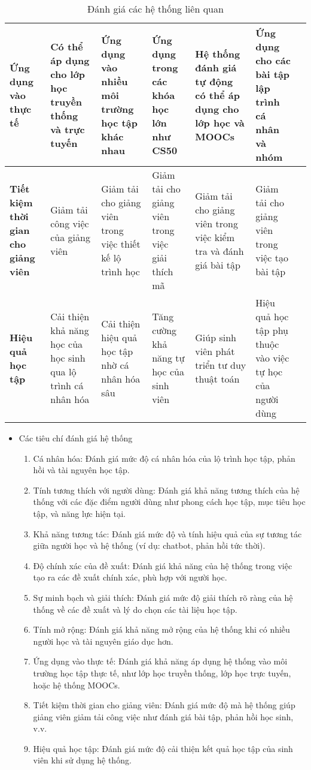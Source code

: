 \begin{table}[ht]
{\begin{tabular}{|p{3.5cm}|p{3.5cm}|p{3.5cm}|p{3.5cm}|p{3.5cm}|p{3.5cm}|p{3.5cm}|}
    \textbf{Ứng dụng vào thực tế} & Có thể áp dụng cho lớp học truyền thống và trực tuyến & Ứng dụng vào nhiều môi trường học tập khác nhau & Ứng dụng trong các khóa học lớn như CS50 & Hệ thống đánh giá tự động có thể áp dụng cho lớp học và MOOCs & Ứng dụng cho các bài tập lập trình cá nhân và nhóm \\ \hline
    \textbf{Tiết kiệm thời gian cho giảng viên} & Giảm tải công việc của giảng viên & Giảm tải cho giảng viên trong việc thiết kế lộ trình học & Giảm tải cho giảng viên trong việc giải thích mã & Giảm tải cho giảng viên trong việc kiểm tra và đánh giá bài tập & Giảm tải cho giảng viên trong việc tạo bài tập \\ \hline
    \textbf{Hiệu quả học tập} & Cải thiện khả năng học của học sinh qua lộ trình cá nhân hóa & Cải thiện hiệu quả học tập nhờ cá nhân hóa sâu & Tăng cường khả năng tự học của sinh viên & Giúp sinh viên phát triển tư duy thuật toán & Hiệu quả học tập phụ thuộc vào việc tự học của người dùng \\ \hline
    \end{tabular}
    }
    \caption{Đánh giá các hệ thống liên quan}
    \end{table}
\begin{itemize}
    \item Các tiêu chí đánh giá hệ thống
    \begin{enumerate}
        \item Cá nhân hóa: Đánh giá mức độ cá nhân hóa của lộ trình học tập, phản hồi và tài nguyên học tập.
        \item Tính tương thích với người dùng: Đánh giá khả năng tương thích của hệ thống với các đặc điểm người dùng như phong cách học tập, mục tiêu học tập, và năng lực hiện tại.
        \item Khả năng tương tác: Đánh giá mức độ và tính hiệu quả của sự tương tác giữa người học và hệ thống (ví dụ: chatbot, phản hồi tức thời).
        \item Độ chính xác của đề xuất: Đánh giá khả năng của hệ thống trong việc tạo ra các đề xuất chính xác, phù hợp với người học.
        \item Sự minh bạch và giải thích: Đánh giá mức độ giải thích rõ ràng của hệ thống về các đề xuất và lý do chọn các tài liệu học tập.
        \item Tính mở rộng: Đánh giá khả năng mở rộng của hệ thống khi có nhiều người học và tài nguyên giáo dục hơn.
        \item Ứng dụng vào thực tế: Đánh giá khả năng áp dụng hệ thống vào môi trường học tập thực tế, như lớp học truyền thống, lớp học trực tuyến, hoặc hệ thống MOOCs.
        \item Tiết kiệm thời gian cho giảng viên: Đánh giá mức độ mà hệ thống giúp giảng viên giảm tải công việc như đánh giá bài tập, phản hồi học sinh, v.v.
        \item Hiệu quả học tập: Đánh giá mức độ cải thiện kết quả học tập của sinh viên khi sử dụng hệ thống.
    \end{enumerate}
\end{itemize}
